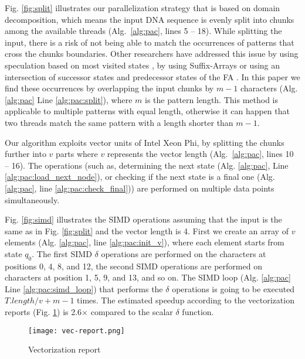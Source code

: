 \documentclass[conference]{IEEEtran}
\begin{document}
Fig. \ref{fig:split} illustrates our parallelization strategy that is based on domain decomposition, which means the input DNA sequence is evenly split into chunks among the available threads (Alg.~\ref{alg:pac}, lines 5 -- 18). While splitting the input, there is a risk of not being able to match the occurrences of patterns that cross the chunks boundaries. Other researchers have addressed this issue by using speculation based on most visited states \cite{LuchaupSEJ11}, by using Suffix-Arrays \cite{Chacon} or using an intersection of successor states and predecessor states of the FA \cite{memeti2014}. In this paper we find these occurrences by overlapping the input chunks by $m-1$ characters (Alg. \ref{alg:pac} Line \ref{alg:pac:split}), where $m$ is the pattern length. This method is applicable to multiple patterns with equal length, otherwise it can happen that two threads match the same pattern with a length shorter than $m-1$.




Our algorithm exploits vector units of Intel Xeon Phi, by splitting the chunks further into $v$ parts where $v$ represents the vector length (Alg.~\ref{alg:pac}, lines 10 -- 16). The operations (such as, determining the next state (Alg. \ref{alg:pac}, Line \ref{alg:pac:load_next_node}), or checking if the next state is a final one (Alg. \ref{alg:pac}, line \ref{alg:pac:check_final})) are performed on multiple data points simultaneously. 

Fig. \ref{fig:simd} illustrates the SIMD operations assuming that the input is the same as in Fig. \ref{fig:split} and the vector length is 4. First we create an array of $v$ elements (Alg. \ref{alg:pac}, line \ref{alg:pac:init_v}), where each element starts from state $q_0$. The first SIMD $\delta$ operations are performed on the characters at positions 0, 4, 8, and 12, the second SIMD operations are performed on characters at position 1, 5, 9, and 13, and so on. The SIMD loop (Alg. \ref{alg:pac} Line \ref{alg:pac:simd_loop}) that performs the $\delta$ operations is going to be executed $T.length / v + m-1$ times. The estimated speedup according to the vectorization reports (Fig. \ref{fig:vec-report}) is 2.6$\times$ compared to the scalar $\delta$ function.

\begin{figure}[h]
	\centering
	\texttt{[image: vec-report.png]}
	\caption{Vectorization report}
	\label{fig:vec-report}
	\vspace{-10pt}
\end{figure}
\end{document}
